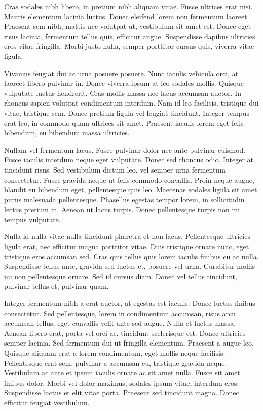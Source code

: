 Cras sodales nibh libero, in pretium nibh aliquam vitae. Fusce ultrices erat
nisi. Mauris elementum lacinia luctus. Donec eleifend lorem non fermentum
laoreet. Praesent sem nibh, mattis nec volutpat ut, vestibulum sit amet est.
Donec eget risus lacinia, fermentum tellus quis, efficitur augue. Suspendisse
dapibus ultricies eros vitae fringilla. Morbi justo nulla, semper porttitor
cursus quis, viverra vitae ligula.

Vivamus feugiat dui ac urna posuere posuere. Nunc iaculis vehicula orci, at
laoreet libero pulvinar in. Donec viverra ipsum at leo sodales mollis. Quisque
vulputate luctus hendrerit. Cras mollis massa nec lacus accumsan auctor. In
rhoncus sapien volutpat condimentum interdum. Nam id leo facilisis, tristique
dui vitae, tristique sem. Donec pretium ligula vel feugiat tincidunt. Integer
tempus erat leo, in commodo quam ultrices sit amet. Praesent iaculis lorem eget
felis bibendum, eu bibendum massa ultricies.

Nullam vel fermentum lacus. Fusce pulvinar dolor nec ante pulvinar euismod.
Fusce iaculis interdum neque eget vulputate. Donec sed rhoncus odio. Integer at
tincidunt risus. Sed vestibulum dictum leo, vel semper urna fermentum
consectetur. Fusce gravida neque ut felis commodo convallis. Proin neque augue,
blandit eu bibendum eget, pellentesque quis leo. Maecenas sodales ligula sit
amet purus malesuada pellentesque. Phasellus egestas tempor lorem, in
sollicitudin lectus pretium in. Aenean ut lacus turpis. Donec pellentesque
turpis non mi tempus vulputate.

Nulla id nulla vitae nulla tincidunt pharetra et non lacus. Pellentesque
ultricies ligula erat, nec efficitur magna porttitor vitae. Duis tristique
ornare nunc, eget tristique eros accumsan sed. Cras quis tellus quis lorem
iaculis finibus eu ac nulla. Suspendisse tellus ante, gravida sed luctus et,
posuere vel urna. Curabitur mollis mi non pellentesque ornare. Sed id cursus
diam. Donec vel tellus tincidunt, pulvinar tellus et, pulvinar quam.

Integer fermentum nibh a erat auctor, at egestas est iaculis. Donec luctus
finibus consectetur. Sed pellentesque, lorem in condimentum accumsan, risus
arcu accumsan tellus, eget convallis velit ante sed augue. Nulla et luctus
massa. Aenean libero erat, porta vel orci ac, tincidunt scelerisque est. Donec
ultricies semper lacinia. Sed fermentum dui ut fringilla elementum. Praesent a
augue leo. Quisque aliquam erat a lorem condimentum, eget mollis neque
facilisis. Pellentesque erat sem, pulvinar a accumsan eu, tristique gravida
neque. Vestibulum ac ante et ipsum iaculis ornare ac sit amet nulla. Fusce sit
amet finibus dolor. Morbi vel dolor maximus, sodales ipsum vitae, interdum
eros. Suspendisse luctus et elit vitae porta. Praesent sed tincidunt magna.
Donec efficitur feugiat vestibulum.

